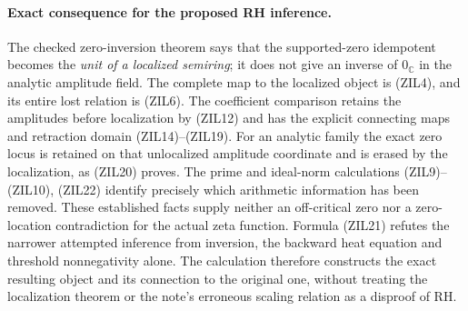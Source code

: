 \paragraph{Exact consequence for the proposed RH inference.}
The checked zero-inversion theorem says that the supported-zero
idempotent becomes the \emph{unit of a localized semiring}; it
does not give an inverse of $0_{\mathbb C}$ in the analytic
amplitude field. The complete map to the localized object is
(ZIL4), and its entire lost relation is (ZIL6). The coefficient
comparison retains the amplitudes before localization by (ZIL12)
and has the explicit connecting maps and retraction domain
(ZIL14)--(ZIL19). For an analytic family the exact zero locus
is retained on that unlocalized amplitude coordinate and is
erased by the localization, as (ZIL20) proves. The prime and
ideal-norm calculations (ZIL9)--(ZIL10), (ZIL22) identify precisely
which arithmetic information has been removed. These established
facts supply neither an off-critical zero nor a zero-location
contradiction for the actual zeta function. Formula (ZIL21)
refutes the narrower attempted inference from inversion, the
backward heat equation and threshold nonnegativity alone.
The calculation therefore constructs the exact resulting object
and its connection to the original one, without treating the
localization theorem or the note's erroneous scaling relation
as a disproof of RH.
